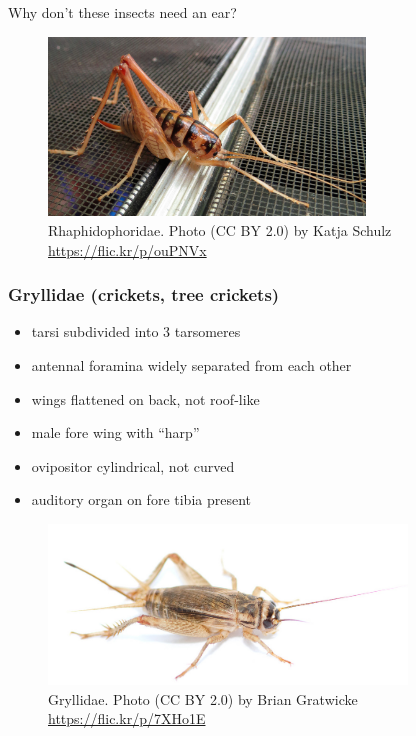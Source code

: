 \documentclass[letterpaper, 11pt]{article}
\begin{document}
\noindent{}Why don't these insects need an ear?\vspace{3cm}

\begin{figure}[ht!]
  \centering
    \includegraphics[width=0.75\textwidth]{rhaphid}
  \caption{Rhaphidophoridae. Photo (CC BY 2.0) by Katja Schulz \url{https://flic.kr/p/ouPNVx}}
  \label{fig:rhaphid}
\end{figure}

\subsubsection*{Gryllidae (crickets, tree crickets)}
\begin{itemize}
\item tarsi subdivided into 3 tarsomeres
\item antennal foramina widely separated from each other
\item wings flattened on back, not roof-like 
\item male fore wing with ``harp''
\item ovipositor cylindrical, not curved
\item auditory organ on fore tibia present
\end{itemize}

\begin{figure}[ht!]
  \centering
    \includegraphics[width=0.85\textwidth]{gryll}
  \caption{Gryllidae. Photo (CC BY 2.0) by Brian Gratwicke \url{https://flic.kr/p/7XHo1E}}
  \label{fig:gryllid}
\end{figure}
\end{document}
